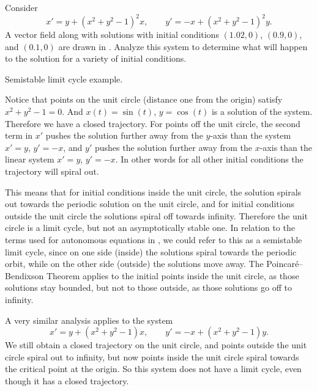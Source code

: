 \begin{example}
Consider
\begin{equation*}
x' = y + {(x^2+y^2-1)}^2 x, \qquad
y' = -x + {(x^2+y^2-1)}^2 y.
\end{equation*}
A vector field along with solutions with initial conditions
$(1.02,0)$, $(0.9,0)$, and $(0.1,0)$ are drawn in
. Analyze this system to determine what will happen to the solution for a variety of initial conditions.


\begin{myfig}
\capstart
{}
\caption{Semistable limit cycle example.\label{fig:nlin-unstable-limit-cycle}}
\end{myfig}
\end{example}

\begin{exampleSol}
Notice that points on the unit circle (distance one from the origin)
satisfy $x^2+y^2-1=0$.  And $x(t) = \sin(t)$, $y = \cos(t)$ is a solution
of the system.  Therefore we have a closed trajectory.
For points off the unit circle, the second term in
$x'$ pushes the solution further
away from the $y$-axis than the system $x' = y$, $y' = -x$,
and $y'$ pushes the solution further away from the $x$-axis
than the linear system $x'=y$, $y' = -x$.  In other words for all
other initial conditions the trajectory will spiral out.

This means that for initial conditions inside the unit circle, the solution
spirals out towards the periodic solution on the unit circle, and
for initial conditions outside the unit circle the solutions spiral off
towards infinity.  Therefore the unit circle is a limit cycle, but
not an asymptotically stable one. In relation to the terms used for autonomous equations in , we could refer to this as a semistable limit cycle, since on one side (inside) the solutions spiral towards the periodic orbit, while on the other side (outside) the solutions move away. The Poincar\'e--Bendixson Theorem applies to the initial points inside
the unit circle, as those solutions stay bounded, but not to those outside,
as those solutions go off to infinity.
\end{exampleSol}

A very similar analysis applies to the system
\begin{equation*}
x' = y + {(x^2+y^2-1)} x, \qquad
y' = -x + {(x^2+y^2-1)} y.
\end{equation*}
We still obtain a closed trajectory on the unit circle, and
points outside the unit circle spiral out to infinity, but now points
inside the unit circle spiral towards the critical point at the origin.
So this system does not have a limit cycle, even though it has a closed
trajectory.

